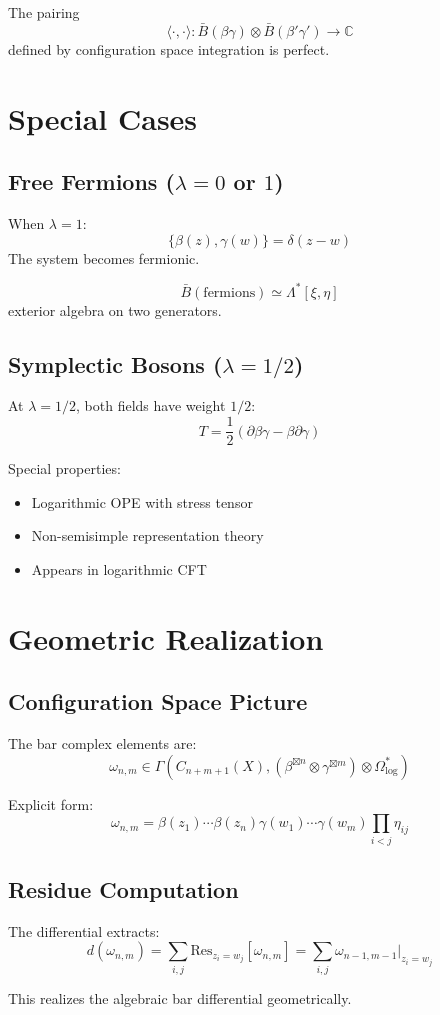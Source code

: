 \begin{proposition}
The pairing
$$\langle \cdot, \cdot \rangle: \bar{B}(\beta\gamma) \otimes \bar{B}(\beta'\gamma') \to \mathbb{C}$$
defined by configuration space integration is perfect.
\end{proposition}

\section{Special Cases}

\subsection{Free Fermions ($\lambda = 0$ or $1$)}

When $\lambda = 1$:
$$\{\beta(z), \gamma(w)\} = \delta(z-w)$$
The system becomes fermionic.

\begin{theorem}
$$\bar{B}(\text{fermions}) \simeq \Lambda^*[\xi, \eta]$$
exterior algebra on two generators.
\end{theorem}

\subsection{Symplectic Bosons ($\lambda = 1/2$)}

At $\lambda = 1/2$, both fields have weight $1/2$:
$$T = \frac{1}{2}(\partial\beta\gamma - \beta\partial\gamma)$$

Special properties:
\begin{itemize}
\item Logarithmic OPE with stress tensor
\item Non-semisimple representation theory
\item Appears in logarithmic CFT
\end{itemize}

\section{Geometric Realization}

\subsection{Configuration Space Picture}

The bar complex elements are:
$$\omega_{n,m} \in \Gamma(C_{n+m+1}(X), (\beta^{\boxtimes n} \otimes \gamma^{\boxtimes m}) \otimes \Omega^*_{\log})$$

Explicit form:
$$\omega_{n,m} = \beta(z_1) \cdots \beta(z_n) \gamma(w_1) \cdots \gamma(w_m) \prod_{i<j} \eta_{ij}$$

\subsection{Residue Computation}

The differential extracts:
$$d(\omega_{n,m}) = \sum_{i,j} \text{Res}_{z_i = w_j}[\omega_{n,m}] = \sum_{i,j} \omega_{n-1,m-1}|_{z_i = w_j}$$

This realizes the algebraic bar differential geometrically.